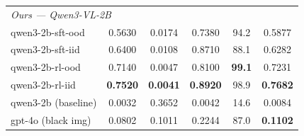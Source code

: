 \begin{table}[t]
\begin{tabular}{l c c c c c}
  \midrule                                                                                                                                            
  \multicolumn{6}{l}{\textit{Ours --- Qwen3-VL-2B}} \\                                                                                                
  qwen3-2b-sft-ood                    & 0.5630          & 0.0174          & 0.7380          & 94.2          & 0.5877 \\                               
  qwen3-2b-sft-iid                    & 0.6400          & 0.0108          & 0.8710          & 88.1          & 0.6282 \\                               
  qwen3-2b-rl-ood                     & 0.7140          & 0.0047          & 0.8100          & \textbf{99.1} & 0.7231 \\                               
  qwen3-2b-rl-iid                     & \textbf{0.7520} & \textbf{0.0041} & \textbf{0.8920} & 98.9          & \textbf{0.7682} \\                      
  qwen3-2b (baseline)                 & 0.0032          & 0.3652          & 0.0042          & 14.6          & 0.0084 \\                               
  \midrule                                                                                                                                            
  gpt-4o (black img)                  & 0.0802          & 0.1011          & 0.2244          & 87.0          & \textbf{0.1102} \\                      
  \bottomrule                                                                                                                                         
  \end{tabular}                                                                                                                                       
  \end{table}          

